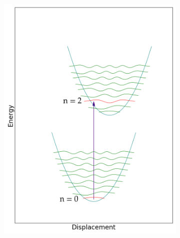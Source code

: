 \documentclass[12pt, fleqn]{beamer}
\begin{document}
\begin{frame}
\begin{overlayarea}{\textwidth}{14cm}
{\begin{figure}[h!]
\begin{subfigure}[b]{0.45\linewidth}
                    \includegraphics[width=\linewidth]{fc/tr_2.png}
                \end{subfigure}
                \begin{subfigure}[b]{0.45\linewidth}

\end{subfigure}
\end{figure}}
\end{overlayarea}
\end{frame}
\end{document}

